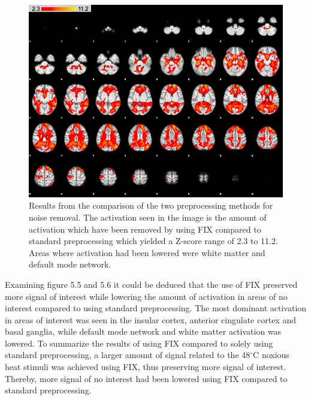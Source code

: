 \begin{figure}[H]                 
	\includegraphics[width=.65\textwidth]{figures/Results/diff_neg}  
	\caption{Results from the comparison of the two preprocessing methods for noise removal. The activation seen in the image is the amount of activation which have been removed by using FIX compared to standard preprocessing which yielded a Z-score range of 2.3 to 11.2. Areas where activation had been lowered were white matter and default mode network.}
	\label{fig:res:diff_neg} 
\end{figure}
Examining figure 5.5 and 5.6 it could be deduced that the use of FIX preserved more signal of interest while lowering the amount of activation in areas of no interest compared to using standard preprocessing. The most dominant activation in areas of interest was seen in the insular cortex, anterior cingulate cortex and basal ganglia, while default mode network and white matter activation was lowered.
To summarize the results of using FIX compared to solely using standard preprocessing, a larger amount of signal related to the 48$^\circ$C noxious heat stimuli was achieved using FIX, thus preserving more signal of interest. Thereby, more signal of no interest had been lowered using FIX compared to standard preprocessing. 
